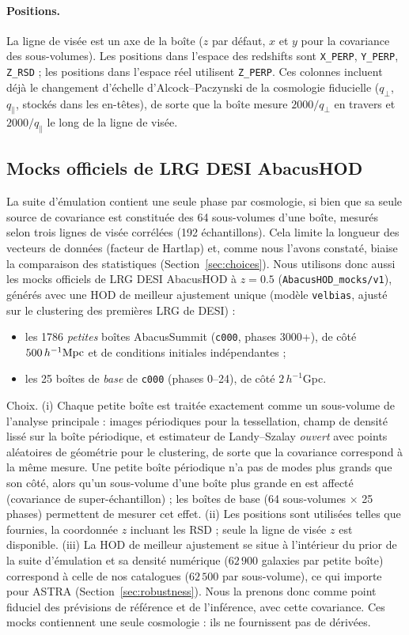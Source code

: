 \paragraph{Positions.} La ligne de visée est un axe de la boîte ($z$ par défaut, $x$ et $y$ pour la covariance des sous-volumes). Les positions dans l'espace des redshifts sont \texttt{X\_PERP}, \texttt{Y\_PERP}, \texttt{Z\_RSD} ; les positions dans l'espace réel utilisent \texttt{Z\_PERP}. Ces colonnes incluent déjà le changement d'échelle d'Alcock--Paczynski de la cosmologie fiducielle ($q_\perp$, $q_\parallel$, stockés dans les en-têtes), de sorte que la boîte mesure $2000/q_\perp$ en travers et $2000/q_\parallel$ le long de la ligne de visée.

\subsection{Mocks officiels de LRG DESI AbacusHOD}
\label{sec:official}

La suite d'émulation contient une seule phase par cosmologie, si bien que sa seule source de covariance est constituée des 64 sous-volumes d'une boîte, mesurés selon trois lignes de visée corrélées (192 échantillons). Cela limite la longueur des vecteurs de données (facteur de Hartlap) et, comme nous l'avons constaté, biaise la comparaison des statistiques (Section~\ref{sec:choices}). Nous utilisons donc aussi les mocks officiels de LRG DESI AbacusHOD à $z=0.5$ \cite{Yuan2022} (\texttt{AbacusHOD\_mocks/v1}), générés avec une HOD de meilleur ajustement unique (modèle \texttt{velbias}, ajusté sur le clustering des premières LRG de DESI) :
\begin{itemize}
\item les 1786 \emph{petites} boîtes AbacusSummit (\texttt{c000}, phases 3000+), de côté $500\,h^{-1}\mathrm{Mpc}$ et de conditions initiales indépendantes ;
\item les 25 boîtes de \emph{base} de \texttt{c000} (phases 0--24), de côté $2\,h^{-1}$Gpc.
\end{itemize}
Choix. (i) Chaque petite boîte est traitée exactement comme un sous-volume de l'analyse principale : images périodiques pour la tessellation, champ de densité lissé sur la boîte périodique, et estimateur de Landy--Szalay \emph{ouvert} avec points aléatoires de géométrie pour le clustering, de sorte que la covariance correspond à la même mesure. Une petite boîte périodique n'a pas de modes plus grands que son côté, alors qu'un sous-volume d'une boîte plus grande en est affecté (covariance de super-échantillon) ; les boîtes de base (64 sous-volumes $\times$ 25 phases) permettent de mesurer cet effet. (ii) Les positions sont utilisées telles que fournies, la coordonnée $z$ incluant les RSD ; seule la ligne de visée $z$ est disponible. (iii) La HOD de meilleur ajustement se situe à l'intérieur du prior de la suite d'émulation et sa densité numérique ($62\,900$ galaxies par petite boîte) correspond à celle de nos catalogues ($62\,500$ par sous-volume), ce qui importe pour ASTRA (Section~\ref{sec:robustness}). Nous la prenons donc comme point fiduciel des prévisions de référence et de l'inférence, avec cette covariance. Ces mocks contiennent une seule cosmologie : ils ne fournissent pas de dérivées.

